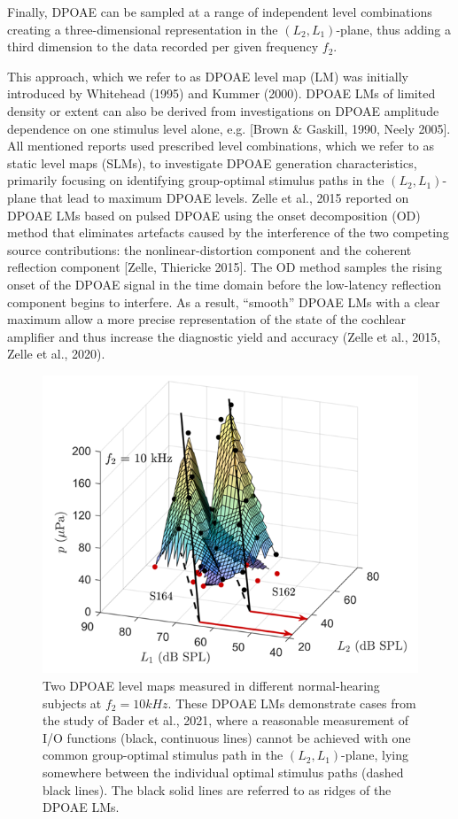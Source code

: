 \documentclass[journal,twoside,web]{ieeecolor2}
\begin{document}
Finally, DPOAE can be sampled at a range of independent level combinations creating a three-dimensional representation in the $(L_2, L_1)$-plane, thus adding a third dimension to the data recorded per given frequency $f_2$.
 
This approach, which we refer to as DPOAE level map (LM) was initially introduced by Whitehead (1995) and Kummer (2000).
DPOAE LMs of limited density or extent can also be derived from investigations on DPOAE amplitude dependence on one stimulus level alone, e.g. [Brown \& Gaskill, 1990, Neely 2005].
All mentioned reports used prescribed level combinations, which we refer to as static level maps (SLMs), to investigate DPOAE generation characteristics, primarily focusing on identifying group-optimal stimulus paths in the $(L_2, L_1)$-plane that lead to maximum DPOAE levels.
Zelle et al., 2015 reported on DPOAE LMs based on pulsed DPOAE using the onset decomposition (OD) method that eliminates artefacts caused by the interference of the two competing source contributions: the nonlinear-distortion component and the coherent reflection component [Zelle, Thiericke 2015].
The OD method samples the rising onset of the DPOAE signal in the time domain before the low-latency reflection component begins to interfere.
As a result, “smooth” DPOAE LMs with a clear maximum allow a more precise representation of the state of the cochlear amplifier and thus increase the diagnostic yield and accuracy (Zelle et al., 2015, Zelle et al., 2020).

\begin{figure}[ht]
\centerline{\includegraphics[width=\columnwidth]{Fig_0_v1.png}}
\caption{Two DPOAE level maps measured in different normal-hearing subjects at $f_2 = 10 kHz$.
These DPOAE LMs demonstrate cases from the study of Bader et al., 2021, where a reasonable measurement of I/O functions (black, continuous lines) cannot be achieved with one common group-optimal stimulus path in the $(L_2, L_1)$-plane, lying somewhere between the individual optimal stimulus paths (dashed black lines).
The black solid lines are referred to as ridges of the DPOAE LMs.}
\label{fig_Bdr}
\end{figure}
\end{document}
